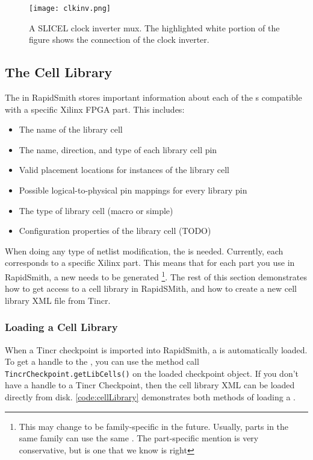 \begin{itemize}
\begin{figure}[H]
 \centering
 \texttt{[image: clkinv.png]}
 \caption{A SLICEL clock inverter mux. The highlighted white portion of the
 figure shows the connection of the clock inverter.}
 \label{fig:clkinv}
\end{figure}
  
  
\end{itemize}

\subsection{The Cell Library}

The  in RapidSmith stores important information about each of
the s compatible with a specific Xilinx FPGA part.
This includes: 

\begin {itemize}
  \item The name of the library cell
  \item The name, direction, and type of each library cell pin
  \item Valid placement locations for instances of the library cell
  \item Possible logical-to-physical pin mappings for every library pin
  \item The type of library cell (macro or simple)
  \item Configuration properties of the library cell (TODO)
\end{itemize}

\noindent
When doing any type of netlist modification, the  is needed.
Currently, each  corresponds to a specific Xilinx
part.
This means that for each part you use in RapidSmith, a new 
needs to be generated \footnote{This may change to be family-specific in the
future. Usually, parts in the same family can use the same
. The part-specific mention is very conservative, but is one
that we know is right}.
The rest of this section demonstrates how to get access to a cell library in
RapidSMith, and how to create a new cell library XML file from Tincr.

\subsubsection{Loading a Cell Library}
When a Tincr checkpoint is imported into RapidSmith, a  is
automatically loaded. To get a handle to the , you can use
the method call \texttt{TincrCheckpoint.getLibCells()} on the loaded checkpoint
object. If you don't have a handle to a Tincr Checkpoint, then the cell
library XML can be loaded directly from disk. \autoref{code:cellLibrary}
demonstrates both methods of loading a .

